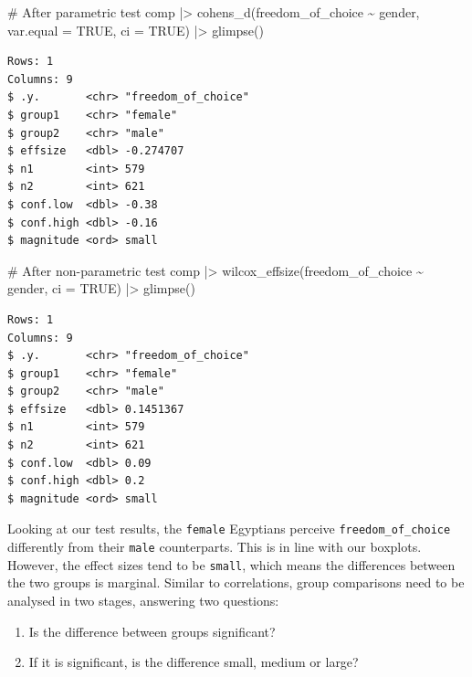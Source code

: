 \documentclass[
  letterpaper,
  DIV=11,
  numbers=noendperiod]{scrreprt}
\newenvironment{Shaded}{\begin{snugshade}}{\end{snugshade}}
\newcommand{\AttributeTok}[1]{\textcolor[rgb]{0.40,0.45,0.13}{#1}}
\newcommand{\CommentTok}[1]{\textcolor[rgb]{0.37,0.37,0.37}{#1}}
\newcommand{\ConstantTok}[1]{\textcolor[rgb]{0.56,0.35,0.01}{#1}}
\newcommand{\FunctionTok}[1]{\textcolor[rgb]{0.28,0.35,0.67}{#1}}
\newcommand{\NormalTok}[1]{\textcolor[rgb]{0.00,0.23,0.31}{#1}}
\newcommand{\SpecialCharTok}[1]{\textcolor[rgb]{0.37,0.37,0.37}{#1}}
\begin{document}
\begin{Shaded}
\begin{Highlighting}[]
\CommentTok{\# After parametric test}
\NormalTok{comp }\SpecialCharTok{|\textgreater{}}
  \FunctionTok{cohens\_d}\NormalTok{(freedom\_of\_choice }\SpecialCharTok{\textasciitilde{}}\NormalTok{ gender,}
           \AttributeTok{var.equal =} \ConstantTok{TRUE}\NormalTok{,}
           \AttributeTok{ci =} \ConstantTok{TRUE}\NormalTok{) }\SpecialCharTok{|\textgreater{}}
  \FunctionTok{glimpse}\NormalTok{()}
\end{Highlighting}
\end{Shaded}

\begin{verbatim}
Rows: 1
Columns: 9
$ .y.       <chr> "freedom_of_choice"
$ group1    <chr> "female"
$ group2    <chr> "male"
$ effsize   <dbl> -0.274707
$ n1        <int> 579
$ n2        <int> 621
$ conf.low  <dbl> -0.38
$ conf.high <dbl> -0.16
$ magnitude <ord> small
\end{verbatim}

\begin{Shaded}
\begin{Highlighting}[]
\CommentTok{\# After non{-}parametric test}
\NormalTok{comp }\SpecialCharTok{|\textgreater{}}
  \FunctionTok{wilcox\_effsize}\NormalTok{(freedom\_of\_choice }\SpecialCharTok{\textasciitilde{}}\NormalTok{ gender,}
                 \AttributeTok{ci =} \ConstantTok{TRUE}\NormalTok{) }\SpecialCharTok{|\textgreater{}}
  \FunctionTok{glimpse}\NormalTok{()}
\end{Highlighting}
\end{Shaded}

\begin{verbatim}
Rows: 1
Columns: 9
$ .y.       <chr> "freedom_of_choice"
$ group1    <chr> "female"
$ group2    <chr> "male"
$ effsize   <dbl> 0.1451367
$ n1        <int> 579
$ n2        <int> 621
$ conf.low  <dbl> 0.09
$ conf.high <dbl> 0.2
$ magnitude <ord> small
\end{verbatim}

Looking at our test results, the \texttt{female} Egyptians perceive
\texttt{freedom\_of\_choice} differently from their \texttt{male}
counterparts. This is in line with our boxplots. However, the effect
sizes tend to be \texttt{small}, which means the differences between the
two groups is marginal. Similar to correlations, group comparisons need
to be analysed in two stages, answering two questions:

\begin{enumerate}
\def\labelenumi{\arabic{enumi}.}
\item
  Is the difference between groups significant?
\item
  If it is significant, is the difference small, medium or large?
\end{enumerate}
\end{document}

